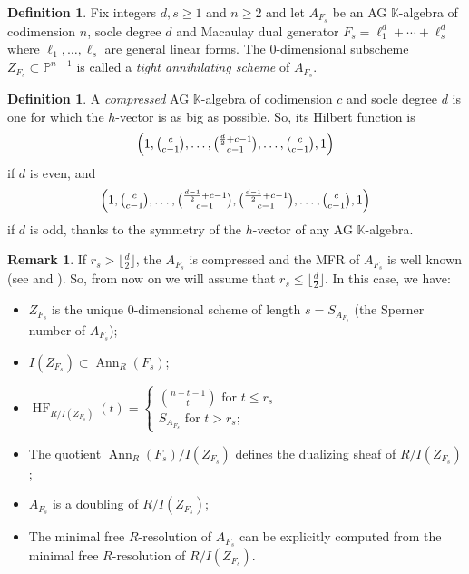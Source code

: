 \documentclass[12pt,twoside]{amsart}
\numberwithin{equation}{section} \hyphenation{semi-stable}
\newcommand{\K}{\mathbb{K}}
\DeclareMathOperator{\HF}{HF}
\DeclareMathOperator{\ann}{Ann}
\theoremstyle{definition}
\newtheorem{definition}[theorem]{Definition}
\newtheorem{remark}[theorem]{Remark}
\begin{document}
 \vskip 1mm  
\begin{definition}  Fix integers $d,s\ge 1$ and $n\ge 2$ and let  $A_{F_s}$ be an  AG $\K$-algebra  of codimension $n$, socle degree $d$ and Macaulay dual generator $F_s=\ell_1^d+\cdots +\ell_s^d$ where $\ell_1, \ldots ,\ell_s$ are general linear forms. The 0-dimensional subscheme  $Z_{F_s}\subset \mathbb{P}^{n-1}$ is called a {\em tight annihilating scheme} of $A_{F_s}$.  
\end{definition}

\begin{definition}\label{compressed}
A \textit{compressed} AG $\K$-algebra of codimension $c$ and socle degree \(d\) is one for which the $h$-vector is as big as possible. So, its Hilbert function is
    $$
    \left( 1,\tbinom{c}{c-1},\dots,\tbinom{\frac{d}{2}+c-1}{c-1},\dots,\tbinom{c}{c-1},1 \right)
    $$
    if $d$ is even, and 
    $$
    \left( 1,\tbinom{c}{c-1},\dots,\tbinom{\frac{d-1}{2}+c-1}{c-1},\tbinom{\frac{d-1}{2}+c-1}{c-1},\dots,\tbinom{c}{c-1},1 \right)
    $$
    if $d$ is odd, thanks to the symmetry of the $h$-vector of any AG $\K$-algebra.    
\end{definition}

\begin{remark}\label{key2}
If $r_s>  \lfloor\frac{d}{2}\rfloor $, the $A_{F_s}$ is compressed and the MFR of $A_{F_s}$ is well known (see \cite{B} and \cite{MMN}).
So, from now on we will assume that  $r_s\le  \lfloor\frac{d}{2}\rfloor $. In this case, we have:
\begin{itemize}
    \item[(i)] $Z_{F_s}$ is the unique 0-dimensional scheme of length $s=S_{A_{F_s}}$ (the Sperner number of $A_{F_s}$);
    \item[(ii)] $I(Z_{F_s})\subset \ann_R(F_s)$;
    \item[(iii)] $
\HF_{R/I(Z_{F_s})}(t)=
\begin{cases}\binom{n+t-1}{t} \text{ for }  t\le r_s\\
S_{A_{F_s}} \text{ for } t> r_s;
\end{cases}
$
\item[(iv)] The quotient $\ann_R(F_s)/I(Z_{F_s})$ defines the dualizing sheaf of $R/I(Z_{F_s})$;
\item[(v)] $A_{F_s}$ is a doubling of $R/I(Z_{F_s})$;
\item[(vi)] The minimal free $R$-resolution of $A_{F_s}$
can be explicitly computed from the minimal free $R$-resolution of  $R/I(Z_{F_s})$.
\end{itemize}
\end{remark}
\end{document}
